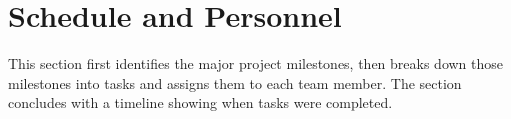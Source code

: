 \section{Schedule and Personnel}
\label{sec:schedule}

This section first identifies the major project milestones, then breaks
down those milestones into tasks and assigns them to each team member.
The section concludes with a timeline showing when tasks were completed.





